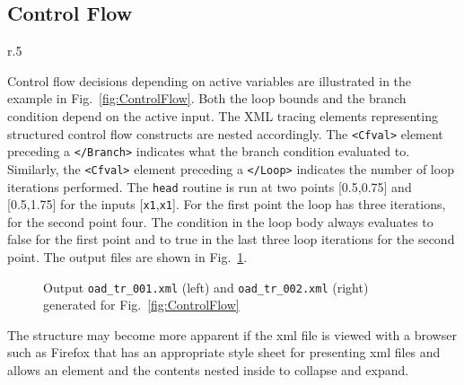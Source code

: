 \documentclass{article}
\newcommand{\reffig}[1]{{Fig.~\ref{#1}}}
\begin{document}
\subsection{Control Flow}
\begin{wrapfigure}[29]{r}{.5\textwidth}
\vspace*{-1.2cm}
\begin{minipage}{.96\linewidth}

\end{minipage}
\caption{Example for control flow decisions depending on active variables}\label{fig:ControlFlow} 
\vspace*{5ex}
\begin{minipage}{.96\linewidth}

\end{minipage}
\caption{Example for tracing array indices in select intrinsics}\label{fig:ArrayIndex} 
\end{wrapfigure} 
Control flow decisions depending on active variables are illustrated in the example in 
\reffig{fig:ControlFlow}.
Both the loop bounds and the branch condition 
depend on the active input.  
The XML tracing elements representing structured control flow constructs are nested accordingly. 
The \lstinline{<Cfval>} element preceding a \lstinline{</Branch>} indicates what the branch 
condition evaluated to. Similarly, the \lstinline{<Cfval>} element preceding a \lstinline{</Loop>} 
indicates the number of loop iterations performed.       
The \lstinline{head} routine 
is run at two  points [0.5,0.75] and [0.5,1.75] for 
the inputs [\lstinline{x1},\lstinline{x1}].
For the first point 
the loop has three iterations, for the second point four. The condition in the 
loop body always evaluates to false for the first point and to true in the last three loop iterations for the second point. The output files are shown in \reffig{fig:ControlFlowOutput}. 
\begin{figure}
\begin{minipage}[t]{.48\textwidth}

\end{minipage}
\begin{minipage}[t]{.48\textwidth}

\end{minipage}
\caption{Output \lstinline{oad_tr_001.xml} (left) 
and \lstinline{oad_tr_002.xml} (right) 
generated for \reffig{fig:ControlFlow}}\label{fig:ControlFlowOutput}
\end{figure}
The structure may become more apparent if the xml file is viewed  
with a browser such as Firefox that has an appropriate style sheet for presenting xml files 
and allows an element and the contents nested inside to collapse and expand. 
\end{document}
